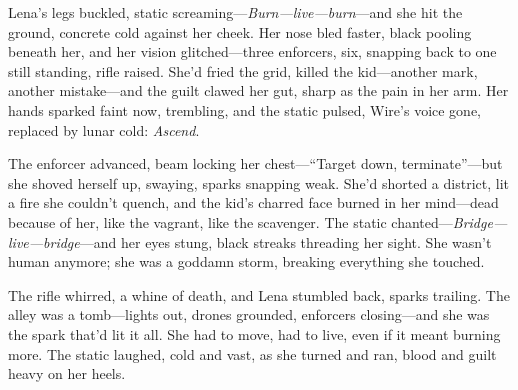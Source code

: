 \documentclass[12pt]{book}
\begin{document}
Lena’s legs buckled, static screaming---\textit{Burn---live---burn}---and she hit the ground, concrete cold against her cheek. Her nose bled faster, black pooling beneath her, and her vision glitched---three enforcers, six, snapping back to one still standing, rifle raised. She’d fried the grid, killed the kid---another mark, another mistake---and the guilt clawed her gut, sharp as the pain in her arm. Her hands sparked faint now, trembling, and the static pulsed, Wire’s voice gone, replaced by lunar cold: \textit{Ascend}.

The enforcer advanced, beam locking her chest---``Target down, terminate''---but she shoved herself up, swaying, sparks snapping weak. She’d shorted a district, lit a fire she couldn’t quench, and the kid’s charred face burned in her mind---dead because of her, like the vagrant, like the scavenger. The static chanted---\textit{Bridge---live---bridge}---and her eyes stung, black streaks threading her sight. She wasn’t human anymore; she was a goddamn storm, breaking everything she touched.

The rifle whirred, a whine of death, and Lena stumbled back, sparks trailing. The alley was a tomb---lights out, drones grounded, enforcers closing---and she was the spark that’d lit it all. She had to move, had to live, even if it meant burning more. The static laughed, cold and vast, as she turned and ran, blood and guilt heavy on her heels.
\end{document}
